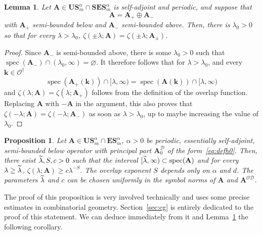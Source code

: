 \documentclass[10pt]{amsart}
\newtheorem{lemm}[theo]{Lemma}\newtheorem{prop}[theo]{Proposition}\newtheorem{coro}[theo]{Corollary}\newtheorem{conj}[theo]{Conjecture}
\theoremstyle{definition}\newtheorem{defi}[theo]{Definition}\newtheorem{rema}[theo]{Remark}\newtheorem{exam}[theo]{Example}\newtheorem{nota}[theo]{Notation}
\DeclareMathOperator{\spec}{spec}
\newcommand{\CD}{\mathcal{D}}
\newcommand{\CO}{\mathcal{O}}
\newcommand{\BA}{\mathbf A}
\newcommand{\BE}{\mathbf E}
\newcommand{\BS}{\mathbf S}
\newcommand{\BU}{\mathbf U}
\newcommand{\bk}{\mathbf k}
\let\oldtilde\tilde
\renewcommand*{\tilde}[1]{\mathchoice{\widetilde{#1}}{\widetilde{#1}}{\oldtilde{#1}}{\oldtilde{#1}}}
\begin{document}
\begin{lemm}\label{lem:semibounded}
Let $\BA \in \BU\BS^\alpha_m \cap \BS\BE\BS^\alpha_m$ is self-adjoint and periodic, and suppose that
\begin{equation}
\BA = \BA_+ \oplus \BA_-
\end{equation}
with $\BA_+$ semi-bounded below and $\BA_-$ semi-bounded above. Then, there is $\lambda_0 > 0$ so that for every $\lambda > \lambda_0$, $\zeta(\pm \lambda;\BA) = \zeta(\pm \lambda; \BA_\pm)$.
\end{lemm}

\begin{proof}
Since $\BA_-$ is semi-bounded above, there is some $\lambda_0 > 0$ such that $\spec(\BA_-) \cap (\lambda_0,\infty) =
\varnothing$. It therefore follows that for $\lambda > \lambda_0$, and every $\bk \in
\CO^\dagger$
\begin{equation}
\spec(\BA_+(\bk)) \cap [\lambda,\infty) = \spec(\BA(\bk)) \cap [\lambda,\infty)
\end{equation}
and $\zeta(\lambda;\BA) = \zeta(\lambda;\BA_+)$ follows from the definition of the overlap function. Replacing $\BA$ with $- \BA$ in the argument, this also proves that $\zeta(-\lambda;\BA) = \zeta(-\lambda;\BA_-)$ as soon as $\lambda >
\lambda_0$, up to maybe increasing the value of $\lambda_0$.
\end{proof}


\begin{prop}\label{thm:uncoupledbs}
Let $\BA \in \BU\BS^\alpha_m \cap \BE\BS_m^\alpha$, $\alpha > 0$ be periodic, essentially self-adjoint, semi-bounded below operator with principal part $\BA_0^\CD$ of the form~\eqref{eq:defh0}. Then, there exist $\tilde \lambda, S,c > 0$ such that the interval $[\tilde \lambda,\infty) \subset \spec(\BA)$ and for every $\lambda \ge \tilde \lambda$, $\zeta(\lambda;\BA) \ge c \lambda^{-S}$. The overlap exponent $S$ depends only on $\alpha$ and $d$. The parameters $\tilde \lambda$ and $c$ can be chosen uniformly in the symbol norms of $\BA$ and $\BA^{\CO\CD}$.
\end{prop}


The proof of this proposition is very involved technically and uses some precise estimates in combinatorial geometry. Section~\ref{sec:cg} is entirely dedicated to the proof of this statement. We can deduce immediately from it and Lemma~\ref{lem:semibounded} the following corollary.
\end{document}
